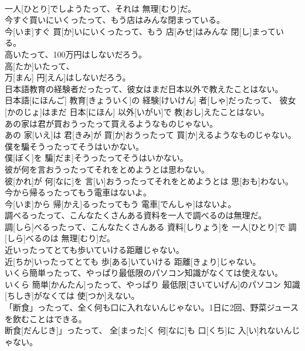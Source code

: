 \documentclass[8pt]{extreport}
\begin{document}
\begin{CJK}{UTF8}{min}
\\	一人[ひとり]でしようたって、それは 無理[むり]だ。
\\	今すぐ買いにいくったって、もう店はみんな閉まっている。	
\\	今[いま]すぐ 買[か]いにいくったって、もう 店[みせ]はみんな 閉[し]まっている。
\\	高いたって、100万円はしないだろう。	
\\	高[たか]いたって、 
\\	万[まん] 円[えん]はしないだろう。
\\	日本語教育の経験者だったって、彼女はまだ日本以外で教えたことはない。	
\\	日本語[にほんご] 教育[きょういく]の 経験[けいけん] 者[しゃ]だったって、 彼女[かのじょ]はまだ 日本[にほん] 以外[いがい]で 教[おし]えたことはない。
\\	あの家は君が買おうったって買えるようなものじゃない。	
\\	あの 家[いえ]は 君[きみ]が 買[か]おうったって 買[か]えるようなものじゃない。
\\	僕を騙そうったってそうはいかない。	
\\	僕[ぼく]を 騙[だま]そうったってそうはいかない。
\\	彼が何を言おうったってそれをとめようとは思わない。	
\\	彼[かれ]が 何[なに]を 言[い]おうったってそれをとめようとは 思[おも]わない。
\\	今から帰るったってもう電車はないよ。	
\\	今[いま]から 帰[かえ]るったってもう 電車[でんしゃ]はないよ。
\\	調べるったって、こんなたくさんある資料を一人で調べるのは無理だ。	
\\	調[しら]べるったって、こんなたくさんある 資料[しりょう]を 一人[ひとり]で 調[しら]べるのは 無理[むり]だ。
\\	近いったってとても歩いていける距離じゃない。	
\\	近[ちか]いったってとても 歩[ある]いていける 距離[きょり]じゃない。
\\	いくら簡単ったって、やっぱり最低限のパソコン知識がなくては使えない。	
\\	いくら 簡単[かんたん]ったって、やっぱり 最低限[さいていげん]のパソコン 知識[ちしき]がなくては 使[つか]えない。
\\	「断食」ったって、全く何も口に入れないんじゃない。1日に2回、野菜ジュースを飲むことはできる。	
\\	断食[だんじき]」ったって、 全[まった]く 何[なに]も 口[くち]に 入[い]れないんじゃない。 

\end{CJK}
\end{document}

